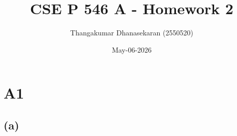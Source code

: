 \documentclass{article}
\title{CSE P 546 A - Homework 2}
\author{Thangakumar Dhanasekaran (2550520)}
\date{May-06-2026}
\begin{document}
\maketitle

\section*{A1}

\subsection*{(a)}
\end{document}
